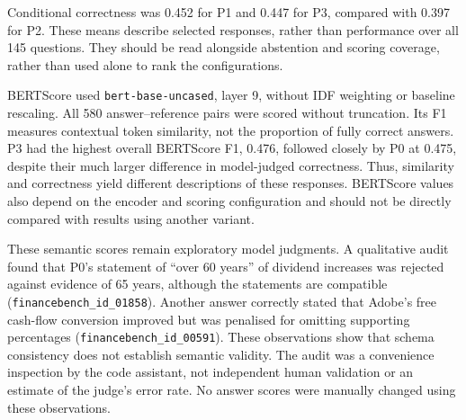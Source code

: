 Conditional correctness was 0.452 for P1 and 0.447 for P3, compared with
0.397 for P2. These means describe selected responses, rather than performance
over all 145 questions. They should be read alongside abstention and scoring
coverage, rather than used alone to rank the configurations.

BERTScore used \texttt{bert-base-uncased}, layer 9, without IDF weighting or
baseline rescaling. All 580 answer--reference pairs were scored without
truncation. Its F1 measures contextual token similarity, not the proportion of
fully correct answers. P3 had the highest overall BERTScore F1, 0.476, followed
closely by P0 at 0.475, despite their much larger difference in model-judged
correctness. Thus, similarity and correctness yield different descriptions
of these responses. BERTScore values also depend on the encoder and scoring
configuration and should not be directly compared with results using another
variant.

These semantic scores remain exploratory model judgments. A qualitative audit
found that P0's statement of ``over 60 years'' of dividend increases was
rejected against evidence of 65 years, although the statements are compatible
(\texttt{financebench\_id\_01858}). Another answer correctly stated that
Adobe's free cash-flow conversion improved but was penalised for omitting
supporting percentages (\texttt{financebench\_id\_00591}). These observations
show that schema consistency does not establish semantic validity. The audit
was a convenience inspection by the code assistant, not independent human
validation or an estimate of the judge's error rate. No answer scores were
manually changed using these observations.

